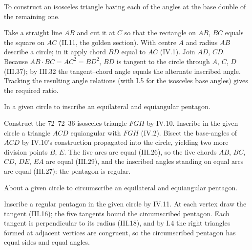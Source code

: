 \documentclass{rrxiv}
\begin{document}
\begin{claim}
\label{prop:IV.10}
To construct an isosceles triangle having each of the angles at the
base double of the remaining one.
\end{claim}
\begin{evidence}[Proof of IV.10]
\label{ev:IV.10}
Take a straight line $AB$ and cut it at $C$ so that the rectangle on
$AB$, $BC$ equals the square on $AC$ (II.11, the golden section).
With centre $A$ and radius $AB$ describe a circle; in it apply chord
$BD$ equal to $AC$ (IV.1).  Join $AD$, $CD$.  Because $AB \cdot BC =
AC^2 = BD^2$, $BD$ is tangent to the circle through $A$, $C$, $D$
(III.37); by III.32 the tangent--chord angle equals the alternate
inscribed angle.  Tracking the resulting angle relations (with I.5
for the isosceles base angles) gives the required ratio.
\end{evidence}

\begin{claim}
\label{prop:IV.11}
In a given circle to inscribe an equilateral and equiangular pentagon.
\end{claim}
\begin{evidence}[Proof of IV.11]
\label{ev:IV.11}
Construct the 72--72--36 isosceles triangle $FGH$ by IV.10.  Inscribe
in the given circle a triangle $ACD$ equiangular with $FGH$ (IV.2).
Bisect the base-angles of $ACD$ by IV.10's construction propagated
into the circle, yielding two more division points $B$, $E$.  The
five arcs are equal (III.26), so the five chords $AB$, $BC$, $CD$,
$DE$, $EA$ are equal (III.29), and the inscribed angles standing on
equal arcs are equal (III.27): the pentagon is regular.
\end{evidence}

\begin{claim}
\label{prop:IV.12}
About a given circle to circumscribe an equilateral and equiangular
pentagon.
\end{claim}
\begin{evidence}[Proof of IV.12]
\label{ev:IV.12}
Inscribe a regular pentagon in the given circle by IV.11.  At each
vertex draw the tangent (III.16); the five tangents bound the
circumscribed pentagon.  Each tangent is perpendicular to its radius
(III.18), and by I.4 the right triangles formed at adjacent vertices
are congruent, so the circumscribed pentagon has equal sides and
equal angles.
\end{evidence}
\end{document}
